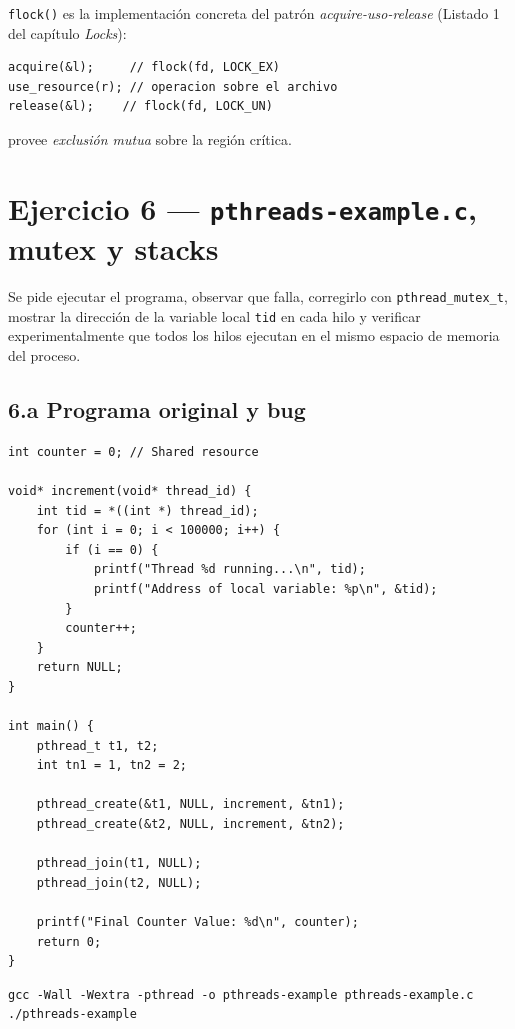 \documentclass[11pt,a4paper]{article}
\begin{document}
\texttt{flock()} es la implementación concreta del patrón
\emph{acquire-uso-release} (Listado 1 del capítulo \emph{Locks}):

\begin{lstlisting}[style=cstyle]
acquire(&l);     // flock(fd, LOCK_EX)
use_resource(r); // operacion sobre el archivo
release(&l);    // flock(fd, LOCK_UN)
\end{lstlisting}

provee \emph{exclusión mutua} sobre la región crítica.

\section{Ejercicio 6 --- \texttt{pthreads-example.c}, mutex y stacks}

Se pide ejecutar el programa, observar que falla, corregirlo con
\texttt{pthread\_mutex\_t}, mostrar la dirección de la variable local
\texttt{tid} en cada hilo y verificar experimentalmente que todos los
hilos ejecutan en el mismo espacio de memoria del proceso.

\subsection*{6.a Programa original y bug}

\begin{lstlisting}[style=cstyle]
int counter = 0; // Shared resource

void* increment(void* thread_id) {
    int tid = *((int *) thread_id);
    for (int i = 0; i < 100000; i++) {
        if (i == 0) {
            printf("Thread %d running...\n", tid);
            printf("Address of local variable: %p\n", &tid);
        }
        counter++;
    }
    return NULL;
}

int main() {
    pthread_t t1, t2;
    int tn1 = 1, tn2 = 2;

    pthread_create(&t1, NULL, increment, &tn1);
    pthread_create(&t2, NULL, increment, &tn2);

    pthread_join(t1, NULL);
    pthread_join(t2, NULL);

    printf("Final Counter Value: %d\n", counter);
    return 0;
}
\end{lstlisting}

\begin{lstlisting}
gcc -Wall -Wextra -pthread -o pthreads-example pthreads-example.c
./pthreads-example
\end{lstlisting}
\end{document}
